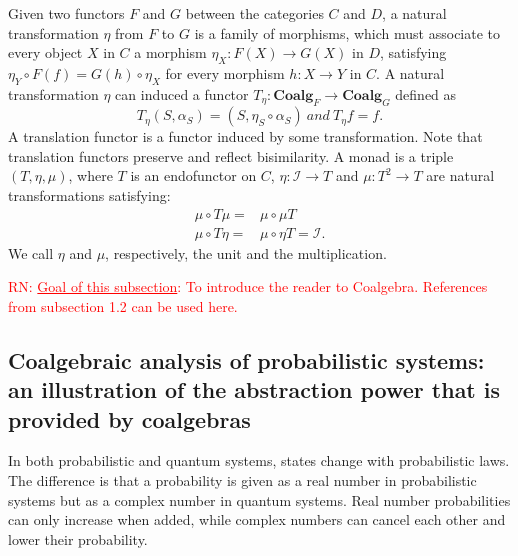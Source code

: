 \documentclass[a4paper, 11pt]{article}
\newcommand{\nevComment}[1]{\textcolor{red}{RN: #1}}
\begin{document}
Given two functors $F$ and $G$ between the categories $C$ and $D$, a natural transformation $\eta$ from $F$ to $G$ is a family of morphisms, which must associate to every object $X$ in $C$ a morphism $\eta_X:F(X)\rightarrow G(X)$ in $D$, satisfying $\eta_Y\circ F(f)=G(h)\circ \eta_X$ for every morphism $h:X\rightarrow Y$ in $C$. A natural transformation $\eta$ can induced a functor $T_\eta:\textbf{Coalg}_F\rightarrow \textbf{Coalg}_G$ defined as 
$$T_\eta(S,\alpha_S)=(S,\eta_S\circ \alpha_S)\ and\ T_\eta f=f.$$ 
A translation functor is a functor induced by some transformation. Note that translation functors preserve and reflect bisimilarity. A monad is a triple $(T,\eta,\mu)$, where $T$ is an endofunctor on $C$, $\eta:\mathcal{I}\rightarrow T$ and $\mu:T^2\rightarrow T$ are natural transformations satisfying:
$$
\begin{aligned}
\mu\circ T\mu=&\mu\circ \mu T\\
\mu\circ T\eta=&\mu\circ \eta T=\mathcal{I}.
\end{aligned}
$$
We call $\eta$ and $\mu$, respectively, the unit and the multiplication. 


\nevComment{\underline{Goal of this subsection}: To introduce the reader
to Coalgebra. References from subsection 1.2 can be used here.}


\subsection{Coalgebraic analysis of probabilistic systems: an
  illustration of the abstraction power that is provided by coalgebras}
In both probabilistic and quantum systems, states change with probabilistic laws. The difference is that a probability is given as a real number in probabilistic systems but as a complex number in quantum systems. Real number probabilities can only increase when added, while complex numbers can cancel each other and lower their probability. 
  
\end{document}
